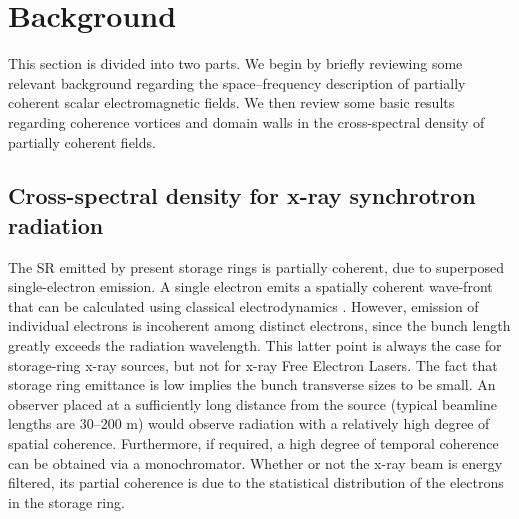 \documentclass[%
 reprint,
 amsmath,amssymb,
 aps,
]{revtex4-1}
\begin{document}
\section{Background}

This section is divided into two parts.  We begin by briefly reviewing some relevant background regarding the space--frequency description of partially coherent scalar electromagnetic fields.  We then review some basic results regarding coherence vortices and domain walls in the cross-spectral density of partially coherent fields.  
\subsection{Cross-spectral density for x-ray synchrotron radiation}

The SR emitted by present storage rings is partially coherent, due to superposed single-electron emission. A single electron emits a spatially coherent wave-front that can be calculated using classical electrodynamics \cite{jackson}. However, emission of individual electrons is incoherent among distinct electrons, since the bunch length greatly exceeds the radiation wavelength.  This latter point is always the case for storage-ring x-ray sources, but not for x-ray Free Electron Lasers. The fact that storage ring emittance is low implies the bunch transverse sizes to be small. An observer placed at a sufficiently long distance from the source (typical beamline lengths are 30--200 m) would observe  radiation with a relatively high degree of  spatial coherence. Furthermore, if required, a high degree of temporal coherence can be obtained via a monochromator.  Whether or not the x-ray beam is energy filtered, its partial coherence is due to the statistical distribution of the electrons in the storage ring. 
\end{document}
